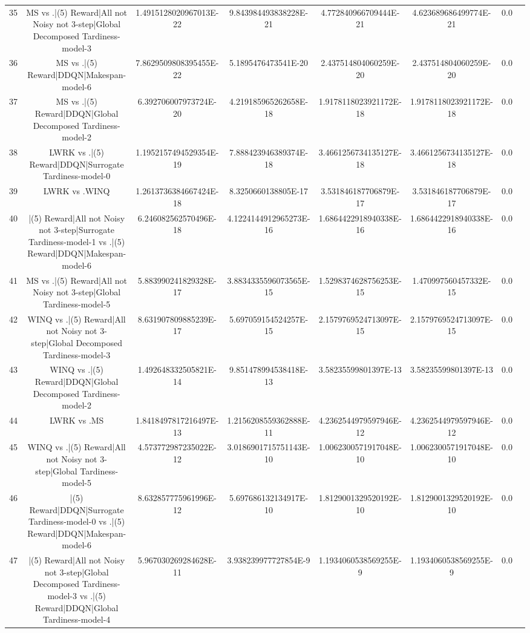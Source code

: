 \documentclass[a3paper,10pt]{article}
\begin{document}
\begin{table}[!htp]
\begin{tabular}{cccccccc}
35&MS vs .|(5) Reward|All not Noisy not 3-step|Global Decomposed Tardiness-model-3&1.4915128020967013E-22&9.843984493838228E-21&4.772840966709444E-21&4.623689686499774E-21&0.0\\
36&MS vs .|(5) Reward|DDQN|Makespan-model-6&7.8629509808395455E-22&5.1895476473541E-20&2.437514804060259E-20&2.437514804060259E-20&0.0\\
37&MS vs .|(5) Reward|DDQN|Global Decomposed Tardiness-model-2&6.392706007973724E-20&4.219185965262658E-18&1.9178118023921172E-18&1.9178118023921172E-18&0.0\\
38&LWRK vs .|(5) Reward|DDQN|Surrogate Tardiness-model-0&1.1952157494529354E-19&7.888423946389374E-18&3.4661256734135127E-18&3.4661256734135127E-18&0.0\\
39&LWRK vs .WINQ&1.2613736384667424E-18&8.3250660138805E-17&3.531846187706879E-17&3.531846187706879E-17&0.0\\
40&|(5) Reward|All not Noisy not 3-step|Surrogate Tardiness-model-1 vs .|(5) Reward|DDQN|Makespan-model-6&6.246082562570496E-18&4.1224144912965273E-16&1.6864422918940338E-16&1.6864422918940338E-16&0.0\\
41&MS vs .|(5) Reward|All not Noisy not 3-step|Global Tardiness-model-5&5.883990241829328E-17&3.8834335596073565E-15&1.5298374628756253E-15&1.470997560457332E-15&0.0\\
42&WINQ vs .|(5) Reward|All not Noisy not 3-step|Global Decomposed Tardiness-model-3&8.631907809885239E-17&5.697059154524257E-15&2.1579769524713097E-15&2.1579769524713097E-15&0.0\\
43&WINQ vs .|(5) Reward|DDQN|Global Decomposed Tardiness-model-2&1.492648332505821E-14&9.851478994538418E-13&3.58235599801397E-13&3.58235599801397E-13&0.0\\
44&LWRK vs .MS&1.8418497817216497E-13&1.2156208559362888E-11&4.2362544979597946E-12&4.2362544979597946E-12&0.0\\
45&WINQ vs .|(5) Reward|All not Noisy not 3-step|Global Tardiness-model-5&4.573772987235022E-12&3.0186901715751143E-10&1.0062300571917048E-10&1.0062300571917048E-10&0.0\\
46&|(5) Reward|DDQN|Surrogate Tardiness-model-0 vs .|(5) Reward|DDQN|Makespan-model-6&8.632857775961996E-12&5.697686132134917E-10&1.8129001329520192E-10&1.8129001329520192E-10&0.0\\
47&|(5) Reward|All not Noisy not 3-step|Global Decomposed Tardiness-model-3 vs .|(5) Reward|DDQN|Global Tardiness-model-4&5.967030269284628E-11&3.938239977727854E-9&1.1934060538569255E-9&1.1934060538569255E-9&0.0\\

\end{tabular}
\end{table}
\end{document}
